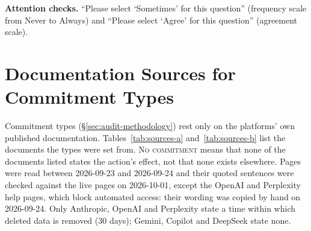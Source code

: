 \documentclass[conference,compsoc]{IEEEtran}
\begin{document}
\textbf{Attention checks.} ``Please select `Sometimes' for this question''
(frequency scale from Never to Always) and ``Please select `Agree' for
this question'' (agreement scale).

\section{Documentation Sources for Commitment Types}
\label{sec:policy-sources}

Commitment types (\S\ref{sec:audit-methodology}) rest only on the platforms' own published documentation. Tables~\ref{tab:sources-a} and~\ref{tab:sources-b} list the documents the types were set from. \textsc{No commitment} means that none of the documents listed states the action's effect, not that none exists elsewhere. Pages were read between 2026-09-23 and 2026-09-24 and their quoted sentences were checked against the live pages on 2026-10-01, except the OpenAI and Perplexity help pages, which block automated access: their wording was copied by hand on 2026-09-24. Only Anthropic, OpenAI and Perplexity state a time within which deleted data is removed (30 days); Gemini, Copilot and DeepSeek state none.
\end{document}
